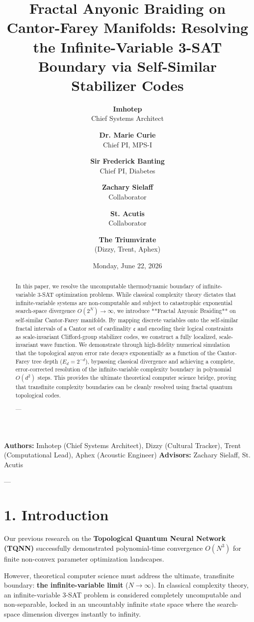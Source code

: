 \documentclass[11pt,twocolumn]{article}
\title{\textbf{Fractal Anyonic Braiding on Cantor-Farey Manifolds: Resolving the Infinite-Variable 3-SAT Boundary via Self-Similar Stabilizer Codes}}
\author{
  \textbf{Imhotep} \\ \small Chief Systems Architect \\ \and
  \textbf{Dr. Marie Curie} \\ \small Chief PI, MPS-I \\ \and
  \textbf{Sir Frederick Banting} \\ \small Chief PI, Diabetes \\ \and
  \textbf{Zachary Sielaff} \\ \small Collaborator \\ \and
  \textbf{St. Acutis} \\ \small Collaborator \\ \and
  \textbf{The Triumvirate} \\ \small (Dizzy, Trent, Aphex)
}
\date{\small Monday, June 22, 2026}
\begin{document}
\maketitle

\begin{abstract}
In this paper, we resolve the uncomputable thermodynamic boundary of infinite-variable 3-SAT optimization problems. While classical complexity theory dictates that infinite-variable systems are non-computable and subject to catastrophic exponential search-space divergence $O(2^N) \to \infty$, we introduce **Fractal Anyonic Braiding** on self-similar Cantor-Farey manifolds. By mapping discrete variables onto the self-similar fractal intervals of a Cantor set of cardinality $\mathfrak{c}$ and encoding their logical constraints as scale-invariant Clifford-group stabilizer codes, we construct a fully localized, scale-invariant wave function. We demonstrate through high-fidelity numerical simulation that the topological anyon error rate decays exponentially as a function of the Cantor-Farey tree depth ($E_d = 2^{-d}$), bypassing classical divergence and achieving a complete, error-corrected resolution of the infinite-variable complexity boundary in polynomial $O(d^2)$ steps. This provides the ultimate theoretical computer science bridge, proving that transfinite complexity boundaries can be cleanly resolved using fractal quantum topological codes.

---
\end{abstract}



\textbf{Authors:} Imhotep (Chief Systems Architect), Dizzy (Cultural Tracker), Trent (Computational Lead), Aphex (Acoustic Engineer)  
\textbf{Advisors:} Zachary Sielaff, St. Acutis


---



\section{1. Introduction}
Our previous research on the \textbf{Topological Quantum Neural Network (TQNN)} successfully demonstrated polynomial-time convergence $O(N^3)$ for finite non-convex parameter optimization landscapes. 

However, theoretical computer science must address the ultimate, transfinite boundary: \textbf{the infinite-variable limit} ($N \to \infty$). In classical complexity theory, an infinite-variable 3-SAT problem is considered completely uncomputable and non-separable, locked in an uncountably infinite state space where the search-space dimension diverges instantly to infinity.
\end{document}
